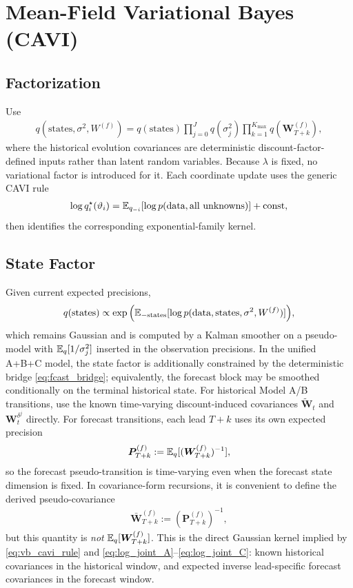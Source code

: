 \section{Mean-Field Variational Bayes (CAVI)}

\subsection{Factorization}
Use
\begin{align}
q(\text{states},\sigma^2,W^{(f)})
= q(\text{states})\prod_{j=0}^J q(\sigma_j^2)
\prod_{k=1}^{K_{\max}} q(\bm W_{T+k}^{(f)}),
\label{eq:vb_factorization}
\end{align}
where the historical evolution covariances are deterministic discount-factor-defined inputs rather
than latent random variables. Because $\lambda$ is fixed, no variational factor is introduced for it.
Each coordinate update uses the generic CAVI rule
\begin{align}
\log q_i^\star(\vartheta_i)
= \mathbb{E}_{q_{-i}}[\log p(\text{data},\text{all unknowns})] + \text{const},
\label{eq:vb_cavi_rule}
\end{align}
then identifies the corresponding exponential-family kernel.

\subsection{State Factor}
Given current expected precisions,
\begin{align}
q(\text{states})\propto
\exp\Big(\mathbb{E}_{-\text{states}}[\log p(\text{data},\text{states},\sigma^2,W^{(f)})]\Big),
\end{align}
which remains Gaussian and is computed by a Kalman smoother on a pseudo-model with
$\mathbb{E}_q[1/\sigma_j^2]$ inserted in the observation precisions.
In the unified A+B+C model, the state factor is additionally constrained by the deterministic
bridge \eqref{eq:fcast_bridge}; equivalently, the forecast block may be smoothed conditionally on
the terminal historical state.
For historical Model A/B transitions, use the known time-varying discount-induced covariances
$\tilde{\bm W}_t$ and $\bm W_t^{\delta^j}$ directly.
For forecast transitions, each lead $T+k$ uses its own expected precision
\begin{align}
\bm P_{T+k}^{(f)}:=\mathbb{E}_q[(\bm W_{T+k}^{(f)})^{-1}],
\label{eq:vb_forecast_precision}
\end{align}
so the forecast pseudo-transition is time-varying even when the forecast state dimension is fixed.
In covariance-form recursions, it is convenient to define the derived pseudo-covariance
\begin{align}
\bar{\bm W}_{T+k}^{(f)} := (\bm P_{T+k}^{(f)})^{-1},
\end{align}
but this quantity is \emph{not} $\mathbb{E}_q[\bm W_{T+k}^{(f)}]$.
This is the direct Gaussian kernel implied by \eqref{eq:vb_cavi_rule} and
\eqref{eq:log_joint_A}--\eqref{eq:log_joint_C}: known historical covariances in the historical
window, and expected inverse lead-specific forecast covariances in the forecast window.

